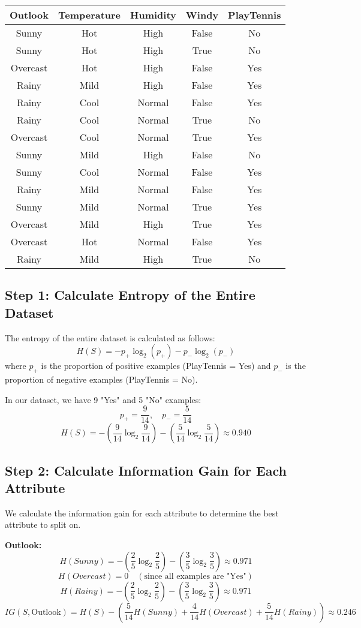 \documentclass[12pt]{article}
\begin{document}
\begin{tabular}{|c|c|c|c|c|}
\hline
Outlook & Temperature & Humidity & Windy & PlayTennis \\
\hline
Sunny & Hot & High & False & No \\
Sunny & Hot & High & True & No \\
Overcast & Hot & High & False & Yes \\
Rainy & Mild & High & False & Yes \\
Rainy & Cool & Normal & False & Yes \\
Rainy & Cool & Normal & True & No \\
Overcast & Cool & Normal & True & Yes \\
Sunny & Mild & High & False & No \\
Sunny & Cool & Normal & False & Yes \\
Rainy & Mild & Normal & False & Yes \\
Sunny & Mild & Normal & True & Yes \\
Overcast & Mild & High & True & Yes \\
Overcast & Hot & Normal & False & Yes \\
Rainy & Mild & High & True & No \\
\hline
\end{tabular}

\subsection{Step 1: Calculate Entropy of the Entire Dataset}
The entropy of the entire dataset is calculated as follows:
\[
H(S) = -p_+ \log_2(p_+) - p_- \log_2(p_-)
\]
where \( p_+ \) is the proportion of positive examples (PlayTennis = Yes) and \( p_- \) is the proportion of negative examples (PlayTennis = No).

In our dataset, we have 9 "Yes" and 5 "No" examples:
\[
p_+ = \frac{9}{14}, \quad p_- = \frac{5}{14}
\]
\[
H(S) = -\left(\frac{9}{14} \log_2 \frac{9}{14}\right) - \left(\frac{5}{14} \log_2 \frac{5}{14}\right) \approx 0.940
\]

\subsection{Step 2: Calculate Information Gain for Each Attribute}
We calculate the information gain for each attribute to determine the best attribute to split on.

\textbf{Outlook:}
\[
H(Sunny) = -\left(\frac{2}{5} \log_2 \frac{2}{5}\right) - \left(\frac{3}{5} \log_2 \frac{3}{5}\right) \approx 0.971
\]
\[
H(Overcast) = 0 \quad (\text{since all examples are "Yes"})
\]
\[
H(Rainy) = -\left(\frac{2}{5} \log_2 \frac{2}{5}\right) - \left(\frac{3}{5} \log_2 \frac{3}{5}\right) \approx 0.971
\]
\[
IG(S, \text{Outlook}) = H(S) - \left(\frac{5}{14} H(Sunny) + \frac{4}{14} H(Overcast) + \frac{5}{14} H(Rainy)\right) \approx 0.246
\]
\end{document}
